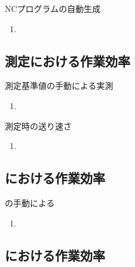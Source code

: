 \begin{Issues}{NCプログラムの自動生成\TBW}
\begin{enumerate}[label=\sarrow]
\item[{\sarrow[red]}]
\end{enumerate}
\end{Issues}


\subsection{測定における作業効率}

\begin{Issues}{測定基準値の手動による実測\TBW}
\begin{enumerate}[label=\sarrow]
\item[{\sarrow[red]}]
\end{enumerate}
\end{Issues}

\begin{Issues}{測定時の送り速さ\TBW}
\begin{enumerate}[label=\sarrow]
\item[{\sarrow[red]}]
\end{enumerate}
\end{Issues}


\subsection{\EndFacecutMilling における作業効率}

\begin{Issues}{\EndFacecutMilling の手動による\TDCorrection\TBW}
\begin{enumerate}[label=\sarrow]
\item[{\sarrow[red]}]
\end{enumerate}
\end{Issues}


\subsection{\KeywayMilling における作業効率}

